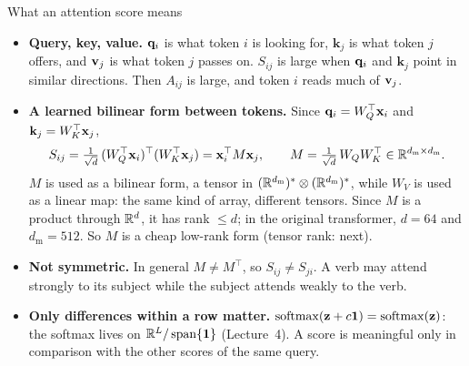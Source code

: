 \documentclass[aspectratio=1610,11pt]{beamer}
\begin{document}
\begin{frame}{What an attention score means}
    \small
    \begin{itemize}
        \item \textbf{Query, key, value.} $\mathbf{q}_i$ is what token $i$ is looking for, $\mathbf{k}_j$ is what token $j$ offers, and $\mathbf{v}_j$ is what token $j$ passes on. $S_{ij}$ is large when $\mathbf{q}_i$ and $\mathbf{k}_j$ point in similar directions. Then $A_{ij}$ is large, and token $i$ reads much of $\mathbf{v}_j$.
        \item \textbf{A learned bilinear form between tokens.} Since $\mathbf{q}_i = W_Q^\top\mathbf{x}_i$ and $\mathbf{k}_j = W_K^\top\mathbf{x}_j$,
        \[S_{ij} = \tfrac{1}{\sqrt d}\,(W_Q^\top\mathbf{x}_i)^\top(W_K^\top\mathbf{x}_j) = \mathbf{x}_i^\top M\mathbf{x}_j, \qquad M = \tfrac{1}{\sqrt d}\,W_QW_K^\top \in \mathbb{R}^{d_{\mathrm{m}} \times d_{\mathrm{m}}}.\]
        $M$ is used as a bilinear form, a tensor in $(\mathbb{R}^{d_{\mathrm{m}}})^* \otimes (\mathbb{R}^{d_{\mathrm{m}}})^*$, while $W_V$ is used as a linear map: the same kind of array, different tensors. Since $M$ is a product through $\mathbb{R}^d$, it has rank $\leq d$; in the original transformer, $d = 64$ and $d_{\mathrm{m}} = 512$. So $M$ is a cheap low-rank form (tensor rank: next).
        \item \textbf{Not symmetric.} In general $M \neq M^\top$, so $S_{ij} \neq S_{ji}$. A verb may attend strongly to its subject while the subject attends weakly to the verb.
        \item \textbf{Only differences within a row matter.} $\operatorname{softmax}(\mathbf{z} + c\mathbf{1}) = \operatorname{softmax}(\mathbf{z})$: the softmax lives on $\mathbb{R}^L/\operatorname{span}\{\mathbf{1}\}$ (Lecture~4). A score is meaningful only in comparison with the other scores of the same query.
    \end{itemize}
\end{frame}
\end{document}
